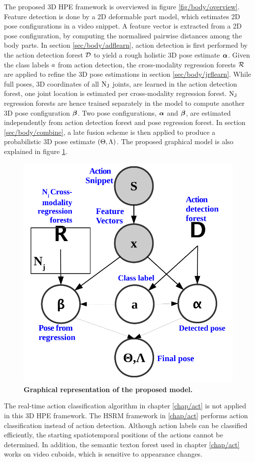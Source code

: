 The proposed 3D HPE framework is overviewed in figure \ref{fig/body/overview}. 
Feature detection is done by a 2D deformable part model, which estimates 2D pose configurations in a video snippet. A feature vector is extracted from a 2D pose configuration, by computing the normalised pairwise distances among the body parts. 
In section \ref{sec/body/adflearn}, action detection is first performed by the action detection forest $\mathcal{D}$ to yield a rough holistic 3D pose estimate $\boldsymbol{\alpha}$. 
Given the class labels $a$ from action detection, the cross-modality regression forests $\mathcal{R}$ are applied to refine the 3D pose estimations in section \ref{sec/body/jrflearn}. 
While full poses, \ie 3D coordinates of all $\mathrm{N_{J}}$ joints, are learned in the action detection forest, one joint location is estimated per cross-modality regression forest. 
$\mathrm{N_{J}}$ regression forests are hence trained separately in the model to compute another 3D pose configuration $\boldsymbol{\beta}$. 
Two pose configurations, $\boldsymbol{\alpha}$ and $\boldsymbol{\beta}$, are estimated independently from action detection forest and pose regression forest. In section \ref{sec/body/combine}, a late fusion scheme is then applied to produce a probabilistic 3D pose estimate $(\Theta, \Lambda)$.  The proposed graphical model is also explained in figure \ref{fig/body/figure4gm}.

\begin{figure}[!ht]
	\centering
	\includegraphics[width=0.35\linewidth]{fig/body/figure4.pdf}
	\caption{\textbf{Graphical representation of the proposed model.}}
	\label{fig/body/figure4gm}
\end{figure}

The real-time action classification algorithm in chapter \ref{chap/act} is not applied in this 3D HPE framework. The HSRM framework in \ref{chap/act} performs action classification instead of action detection. Although action labels can be classified efficiently, the starting spatiotemporal positions of the actions cannot be determined. In addition, the semantic texton forest used in chapter \ref{chap/act} works on video cuboids, which is sensitive to appearance changes. 

